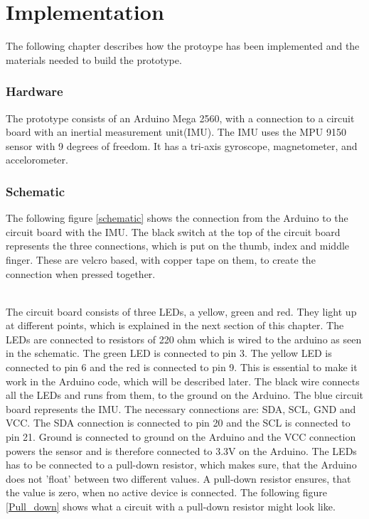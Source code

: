 \chapter{Implementation}

The following chapter describes how the protoype has been implemented and the materials needed to build the prototype. 

\subsection{Hardware}

The prototype consists of an Arduino Mega 2560\citep{Arduino}, with a connection to a circuit board with an inertial measurement unit(IMU). 
The IMU uses the MPU 9150 sensor with 9 degrees of freedom\citep{MPU}. It has a tri-axis gyroscope, magnetometer, and accelorometer.

\subsection{Schematic} 

The following figure \ref{schematic} shows the connection from the Arduino to the circuit board with the IMU. The black switch at the top of the circuit board
represents the three connections, which is put on the thumb, index and middle finger. These are velcro based, with copper tape on them, to create the connection when pressed together. 

\begin{minipage}{\linewidth}%
\label{schematic}
\end{minipage}\\

The circuit board consists of three LEDs, a yellow, green and red. They light up at different points, which is explained in the next section of this chapter.
The LEDs are connected to resistors of 220 ohm which is wired to the arduino as seen in the schematic. The green LED is connected to pin 3. 
The yellow LED is connected to pin 6 and the red is connected to pin 9. This is essential to make it work in the Arduino code, which will be described later. 
The black wire connects all the LEDs and runs from them, to the ground on the Arduino. The blue circuit board represents the IMU. The necessary connections are: SDA, SCL, GND and VCC. 
The SDA connection is connected to pin 20 and the SCL is connected to pin 21. Ground is connected to ground on the Arduino and the VCC connection powers the sensor and is therefore
connected to 3.3V on the Arduino. 
The LEDs has to be connected to a pull-down resistor\citep{Pull_down_res},
which makes sure, that the Arduino does not 'float' between two different values. A pull-down resistor ensures, that the value is zero, when no active device is connected.
The following figure \ref{Pull_down} shows what a circuit with a pull-down resistor might look like. 

